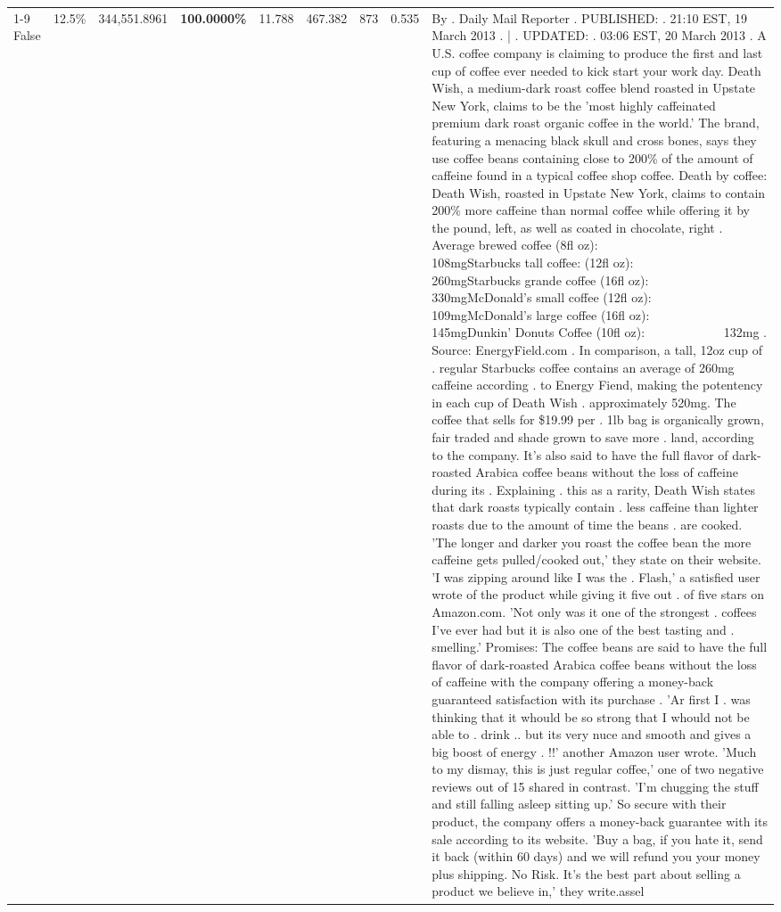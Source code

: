 \begin{table}[H]
{\begin{tabular}{lllrlllll}
\cline{1-9}
False & 12.5\% & 344,551.8961 & \bfseries \color{red} 100.0000\% & 11.788 & 467.382 & 873 & 0.535 & By . Daily Mail Reporter . PUBLISHED: . 21:10 EST, 19 March 2013 . | . UPDATED: . 03:06 EST, 20 March 2013 . A U.S. coffee company is claiming to produce the first and last cup of coffee ever needed to kick start your work day. Death Wish, a medium-dark roast coffee blend roasted in Upstate New York, claims to be the 'most highly caffeinated premium dark roast organic coffee in the world.' The brand, featuring a menacing black skull and cross bones, says they use coffee beans containing close to 200\% of the amount of caffeine found in a typical coffee shop coffee. Death by coffee: Death Wish, roasted in Upstate New York, claims to contain 200\% more caffeine than normal coffee while offering it by the pound, left, as well as coated in chocolate, right . Average brewed coffee (8fl oz):              108mgStarbucks tall coffee: (12fl oz):                260mgStarbucks grande coffee (16fl oz):         330mgMcDonald's small coffee (12fl oz):           109mgMcDonald's large coffee (16fl oz):           145mgDunkin' Donuts Coffee (10fl oz):             132mg . Source: EnergyField.com . In comparison, a tall, 12oz cup of . regular Starbucks coffee contains an average of 260mg caffeine according . to Energy Fiend, making the potentency in each cup of Death Wish . approximately 520mg. The coffee that sells for \$19.99 per . 1lb bag is organically grown, fair traded and shade grown to save more . land, according to the company. It's also said to have the full flavor of dark-roasted Arabica coffee beans without the loss of caffeine during its . Explaining . this as a rarity, Death Wish states that dark roasts typically contain . less caffeine than lighter roasts due to the amount of time the beans . are cooked. 'The longer and darker you roast the coffee bean the more caffeine gets pulled/cooked out,' they state on their website. 'I was zipping around like I was the . Flash,' a satisfied user wrote of the product while giving it five out . of five stars on Amazon.com. 'Not only was it one of the strongest . coffees I've ever had but it is also one of the best tasting and . smelling.’ Promises: The coffee beans are said to have the full flavor of dark-roasted Arabica coffee beans without the loss of caffeine with the company offering a money-back guaranteed satisfaction with its purchase . 'Ar first I . was thinking that it whould be so strong that I whould not be able to . drink .. but its very nuce and smooth and gives a big boost of energy . !!' another Amazon user wrote. 'Much to my dismay, this is just regular coffee,' one of two negative reviews out of 15 shared in contrast. 'I'm chugging the stuff and still falling asleep sitting up.' So secure with their product, the company offers a money-back guarantee with its sale according to its website. 'Buy a bag, if you hate it, send it back (within 60 days) and we will refund you your money plus shipping. No Risk. It’s the best part about selling a product we believe in,' they write.assel \\

\end{tabular}}
\end{table}

